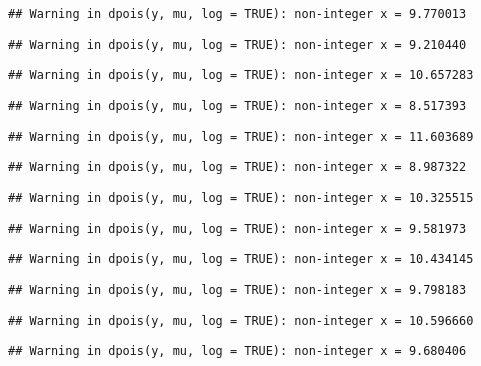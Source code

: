 \documentclass[
]{article}
\begin{document}
\begin{verbatim}
## Warning in dpois(y, mu, log = TRUE): non-integer x = 9.770013
\end{verbatim}

\begin{verbatim}
## Warning in dpois(y, mu, log = TRUE): non-integer x = 9.210440
\end{verbatim}

\begin{verbatim}
## Warning in dpois(y, mu, log = TRUE): non-integer x = 10.657283
\end{verbatim}

\begin{verbatim}
## Warning in dpois(y, mu, log = TRUE): non-integer x = 8.517393
\end{verbatim}

\begin{verbatim}
## Warning in dpois(y, mu, log = TRUE): non-integer x = 11.603689
\end{verbatim}

\begin{verbatim}
## Warning in dpois(y, mu, log = TRUE): non-integer x = 8.987322
\end{verbatim}

\begin{verbatim}
## Warning in dpois(y, mu, log = TRUE): non-integer x = 10.325515
\end{verbatim}

\begin{verbatim}
## Warning in dpois(y, mu, log = TRUE): non-integer x = 9.581973
\end{verbatim}

\begin{verbatim}
## Warning in dpois(y, mu, log = TRUE): non-integer x = 10.434145
\end{verbatim}

\begin{verbatim}
## Warning in dpois(y, mu, log = TRUE): non-integer x = 9.798183
\end{verbatim}

\begin{verbatim}
## Warning in dpois(y, mu, log = TRUE): non-integer x = 10.596660
\end{verbatim}

\begin{verbatim}
## Warning in dpois(y, mu, log = TRUE): non-integer x = 9.680406
\end{verbatim}
\end{document}
